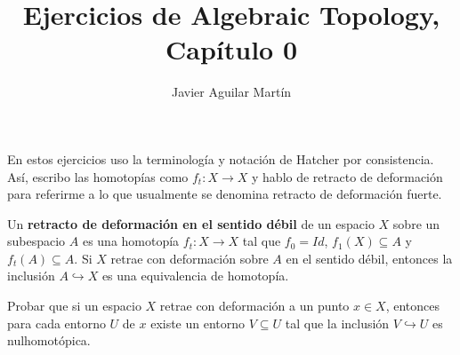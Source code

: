 \documentclass[twoside]{article}
\begin{document}
\title{Ejercicios de Algebraic Topology, Capítulo 0}
\author{Javier Aguilar Martín}
\maketitle

En estos ejercicios uso la terminología y notación de Hatcher por consistencia. Así, escribo las homotopías como $f_t:X\to X$ y hablo de retracto de deformación para referirme a lo que usualmente se denomina retracto de deformación fuerte. 

\begin{lemma}[Ejercicio 0.4]\label{1}
Un \textbf{retracto de deformación en el sentido débil} de un espacio $X$ sobre un subespacio $A$ es una homotopía $f_t:X\to X$ tal que $f_0=Id$, $f_1(X)\subseteq A$ y $f_t(A)\subseteq A$. Si $X$ retrae con deformación sobre $A$ en el sentido débil, entonces la inclusión $A\hookrightarrow X$ es una equivalencia de homotopía. 

\end{lemma}



\begin{ejercicio}{0.5}
Probar que si un espacio $X$ retrae con deformación a un punto $x\in X$, entonces para cada entorno $U$ de $x$ existe un entorno $V\subseteq U$ tal que la inclusión $V\hookrightarrow U$ es nulhomotópica.
\end{ejercicio}
\end{document}
